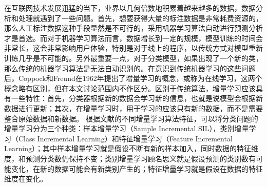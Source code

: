 在互联网技术发展迅猛的当下，业界以几何倍数地积累着越来越多的数据，数据分析和处理就遇到了一些问题。首先，想要获得大量的标注数据是非常耗费资源的，那么人工标注数据这种手段显然是不可行的，采用机器学习算法自动进行预测分析才是首选。而对于机器学习算法而言，数据增长到一定的规模，模型训练的时间会非常长，这会非常影响用户体验，特别是对于线上的程序，以传统方式对模型重新训练几乎是不可能的。另外最重要一点，对于分类模型，如果出现了一个新的类，那么传统的机器学习算法是无法自动识别的。在意识到传统机器学习的这些问题后，Coppock和Freund在1962年提出了增量学习的概念\cite{coppock1962all}，或称为在线学习，这两个概念略有区别，但在本文讨论范围内不作区分。区别于传统算法，增量学习应该具有一些特性：首先，分类器根据新的数据会学习新的信息，也就是说模型会根据新数据进行更新；其次，在增量学习时，用于学习的应该只有新的数据，而不是需要整合原始数据和新数据。 根据文献的不同增量学习算法特征，可以将分类问题的增量学习分为三个种类：样本增量学习（Sample Incremental SIL），类别增量学习（Class Incremental Learning）和特征增量学习（Feature Incremental Learning）\cite{zhong2017survey}；其中样本增量学习就是假设不断有新的样本加入，同时数据的特征维度，和预测分类数仍保持不变；类别增量学习顾名思义就是假设预测的类别数有可能变化，在新的数据可能会有新类别产生的；特征增量学习就是假设在数据的特征维度在变化。

